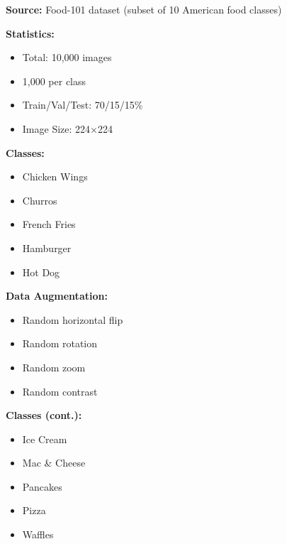 \documentclass[a0,landscape]{a0poster}
\begin{document}
\begin{minipage}[t]{0.32\linewidth}
\vspace{0.5cm}

\begin{tcolorbox}[boxstyle, title=DATASET]
\textbf{Source:} Food-101 dataset (subset of 10 American food classes)

\begin{minipage}[t]{0.48\linewidth}
\textbf{Statistics:}
\begin{itemize}[leftmargin=*,noitemsep]
    \item Total: 10,000 images
    \item 1,000 per class
    \item Train/Val/Test: 70/15/15\%
    \item Image Size: 224×224
\end{itemize}
\end{minipage}
\hfill
\begin{minipage}[t]{0.48\linewidth}
\textbf{Classes:}
\begin{itemize}[leftmargin=*,noitemsep]
    \item Chicken Wings
    \item Churros
    \item French Fries
    \item Hamburger
    \item Hot Dog
\end{itemize}
\end{minipage}

\begin{minipage}[t]{0.48\linewidth}
\textbf{Data Augmentation:}
\begin{itemize}[leftmargin=*,noitemsep]
    \item Random horizontal flip
    \item Random rotation
    \item Random zoom
    \item Random contrast
\end{itemize}
\end{minipage}
\hfill
\begin{minipage}[t]{0.48\linewidth}
\textbf{Classes (cont.):}
\begin{itemize}[leftmargin=*,noitemsep]
    \item Ice Cream
    \item Mac \& Cheese
    \item Pancakes
    \item Pizza
    \item Waffles
\end{itemize}
\end{minipage}
\end{tcolorbox}


\end{minipage}
\end{document}
